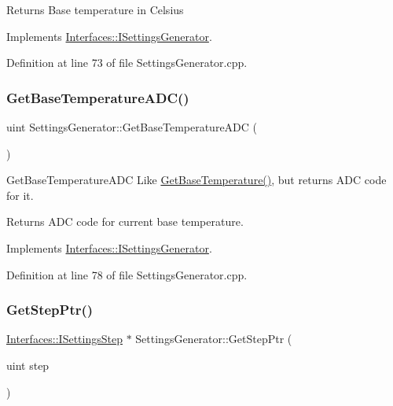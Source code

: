 \begin{DoxyReturn}{Returns}
Base temperature in Celsius 
\end{DoxyReturn}


Implements \hyperlink{class_interfaces_1_1_i_settings_generator_a9cc36185b446f21e09a0e5633f39a1c5}{Interfaces\+::\+I\+Settings\+Generator}.



Definition at line 73 of file Settings\+Generator.\+cpp.

\mbox{\label{class_settings_generator_a5f3f78597f001c127b89f6447a46df09}} 
\subsubsection{\texorpdfstring{Get\+Base\+Temperature\+A\+D\+C()}{GetBaseTemperatureADC()}}
{\footnotesize\ttfamily uint Settings\+Generator\+::\+Get\+Base\+Temperature\+A\+DC (\begin{DoxyParamCaption}{ }\end{DoxyParamCaption})\hspace{0.3cm}{\ttfamily [virtual]}}



Get\+Base\+Temperature\+A\+DC Like \hyperlink{class_settings_generator_a80b1ff8060a16d149989d98a88ab253e}{Get\+Base\+Temperature()}, but returns A\+DC code for it. 

\begin{DoxyReturn}{Returns}
A\+DC code for current base temperature. 
\end{DoxyReturn}


Implements \hyperlink{class_interfaces_1_1_i_settings_generator_a1000ff41c6eecdb55a46c859ca0ebe67}{Interfaces\+::\+I\+Settings\+Generator}.



Definition at line 78 of file Settings\+Generator.\+cpp.

\mbox{\label{class_settings_generator_a37f4175a0ed24853b2f187f15505086b}} 
\subsubsection{\texorpdfstring{Get\+Step\+Ptr()}{GetStepPtr()}}
{\footnotesize\ttfamily \hyperlink{class_interfaces_1_1_i_settings_step}{Interfaces\+::\+I\+Settings\+Step} $\ast$ Settings\+Generator\+::\+Get\+Step\+Ptr (\begin{DoxyParamCaption}\item[{uint}]{step }\end{DoxyParamCaption})\hspace{0.3cm}{\ttfamily [virtual]}}



